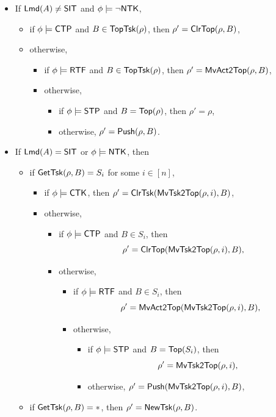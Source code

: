 \medskip

\noindent {}
\begin{itemize}
	\item If ${\sf Lmd}(A) \neq {\sf SIT}$ and $\phi \models \neg {\sf NTK}$, 
	\begin{itemize}
        \item if $\phi \models{\sf CTP}$ and $B \in \mathsf{TopTsk}(\rho)$, then $\rho' =\mathsf{ClrTop}(\rho, B)$,
		\item otherwise,
		\begin{itemize}
			\item if $\phi \models {\sf RTF}$ and $B \in \mathsf{TopTsk}(\rho)$, then $\rho'=\mathsf{MvAct2Top}(\rho, B)$,
			\item otherwise,
			\begin{itemize}
				\item if $\phi \models {\sf STP}$ and $B = \mathsf{Top}(\rho)$, then $\rho' = \rho$,
				\item otherwise, $\rho' = \mathsf{Push}(\rho, B)$.
			\end{itemize}
		\end{itemize}
	\end{itemize}
	\item If ${\sf Lmd}(A) = {\sf SIT}$ or $\phi \models {\sf NTK}$, then
	\begin{itemize}
		\item if $\mathsf{GetTsk}(\rho, B) = S_i$ for some $i\in[n]$,
		\begin{itemize}
            \item if $\phi \models{\sf CTK}$, then $\rho' = \mathsf{ClrTsk}(\mathsf{MvTsk2Top}(\rho, i), B)$,
			\item otherwise, 
			\begin{itemize}
				\item if $\phi \models {\sf CTP}$ and $B \in S_i$, then 
				$$\rho' =\mathsf{ClrTop}(\mathsf{MvTsk2Top}(\rho, i), B),$$
				\item otherwise,
				\begin{itemize}
					\item if $\phi \models {\sf RTF}$ and $B \in S_i$, then 
					$$\rho'=\mathsf{MvAct2Top}(\mathsf{MvTsk2Top}(\rho, i), B),$$
					\item otherwise,
					\begin{itemize}
						\item if $\phi \models {\sf STP}$ and $B = \mathsf{Top}(S_i)$, then 
						$$\rho' = \mathsf{MvTsk2Top}(\rho, i),$$
						\item otherwise, $\rho'=\mathsf{Push}(\mathsf{MvTsk2Top}(\rho, i), B)$,
					\end{itemize}
				\end{itemize}
			\end{itemize}
		\end{itemize}
		\item if $\mathsf{GetTsk}(\rho, B) = *$, then $\rho' = \mathsf{NewTsk}(\rho, B)$.
	\end{itemize}
\end{itemize}

